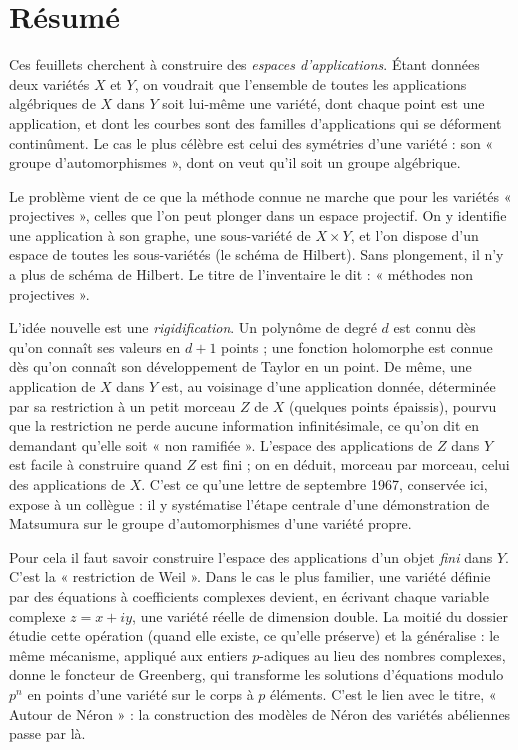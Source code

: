 \documentclass[11pt,a4paper]{article}
\begin{document}
\section*{Résumé}

\begin{resume}
Ces feuillets cherchent à construire des \emph{espaces d'applications}.
Étant données deux variétés $X$ et $Y$, on voudrait que l'ensemble de toutes
les applications algébriques de $X$ dans $Y$ soit lui-même une variété, dont
chaque point est une application, et dont les courbes sont des familles
d'applications qui se déforment continûment. Le cas le plus célèbre est celui
des symétries d'une variété : son « groupe d'automorphismes », dont on veut
qu'il soit un groupe algébrique.

Le problème vient de ce que la méthode connue ne marche que pour les variétés
« projectives », celles que l'on peut plonger dans un espace projectif. On y
identifie une application à son graphe, une sous-variété de $X \times Y$, et
l'on dispose d'un espace de toutes les sous-variétés (le schéma de Hilbert).
Sans plongement, il n'y a plus de schéma de Hilbert. Le titre de
l'inventaire le dit : « méthodes non projectives ».

L'idée nouvelle est une \emph{rigidification}. Un polynôme de degré
$d$ est connu dès qu'on connaît ses valeurs en $d+1$ points ; une fonction
holomorphe est connue dès qu'on connaît son développement de Taylor en un
point. De même, une application de $X$ dans $Y$ est, au voisinage d'une
application donnée, déterminée par sa restriction à un petit morceau $Z$ de
$X$ (quelques points épaissis), pourvu que la restriction ne perde aucune
information infinitésimale, ce qu'on dit en demandant qu'elle soit « non
ramifiée ». L'espace des applications de $Z$ dans $Y$ est facile à construire
quand $Z$ est fini ; on en déduit, morceau par morceau, celui des applications
de $X$. C'est ce qu'une lettre de septembre 1967, conservée ici, expose à
un collègue : il y systématise l'étape centrale d'une démonstration de Matsumura
sur le groupe d'automorphismes d'une variété propre.

Pour cela il faut savoir construire l'espace des applications d'un objet
\emph{fini} dans $Y$. C'est la « restriction de Weil ». Dans le cas le plus
familier, une variété définie par des équations à coefficients complexes
devient, en écrivant chaque variable complexe $z = x + iy$, une variété réelle
de dimension double. La moitié du dossier étudie cette opération (quand elle
existe, ce qu'elle préserve) et la généralise : le même mécanisme, appliqué
aux entiers $p$-adiques au lieu des nombres complexes, donne le foncteur de
Greenberg, qui transforme les solutions d'équations modulo $p^n$ en points
d'une variété sur le corps à $p$ éléments. C'est le lien avec le titre,
« Autour de Néron » : la construction des modèles de Néron des variétés
abéliennes passe par là.


\end{resume}
\end{document}
